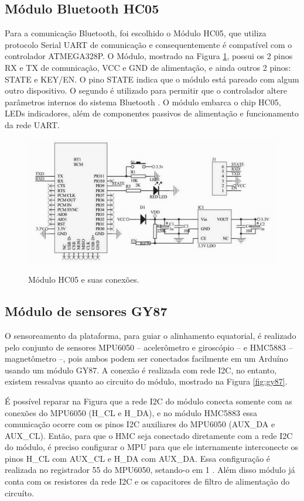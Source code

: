 \subsection{Módulo Bluetooth HC05}
Para a comunicação Bluetooth, foi escolhido o Módulo HC05, que utiliza protocolo Serial UART de comunicação e consequentemente é compatível com o controlador ATMEGA328P. O Módulo, mostrado na Figura \ref{fig:hc05}, possui os 2 pinos RX e TX de comunicação, VCC e GND de alimentação, e ainda outros 2 pinos: STATE e KEY/EN. O pino STATE indica que o módulo está pareado com algum outro dispositivo. O segundo é utilizado para permitir que o controlador altere parâmetros internos do sistema Bluetooth \cite{}. O módulo embarca o chip HC05, LEDs indicadores, além de componentes passivos de alimentação e funcionamento da rede UART.

\begin{figure}[!htb]
	\centering
	\caption{Módulo HC05 e suas conexões.}
	\includegraphics[width=\linewidth]{figuras/desPlataforma/HC05}
	\label{fig:hc05}
\end{figure}

\subsection{Módulo de sensores GY87}
O sensoreamento da plataforma, para guiar o alinhamento equatorial, é realizado pelo conjunto de sensores MPU6050 -- acelerômetro e giroscópio -- e HMC5883 -- magnetômetro --, pois ambos podem ser conectados facilmente em um Arduíno usando um módulo GY87. A conexão é realizada com rede I2C, no entanto, existem ressalvas quanto ao circuito do módulo, mostrado na Figura \ref{fig:gy87}.

É possível reparar na Figura que a rede I2C do módulo conecta somente com as conexões do MPU6050 (H\_CL e H\_DA), e no módulo HMC5883 essa comunicação ocorre com os pinos I2C auxiliares do MPU6050 (AUX\_DA e AUX\_CL). Então, para que o HMC seja conectado diretamente com a rede I2C do módulo, é preciso configurar o MPU para que ele internamente interconecte os pinos H\_CL com AUX\_CL e H\_DA com AUX\_DA.  Essa configuração é realizada no registrador 55 do MPU6050, setando-o em 1 \cite{man:mpu6050}. Além disso módulo já conta com os resistores da rede I2C e os capacitores de filtro de alimentação do circuíto.

